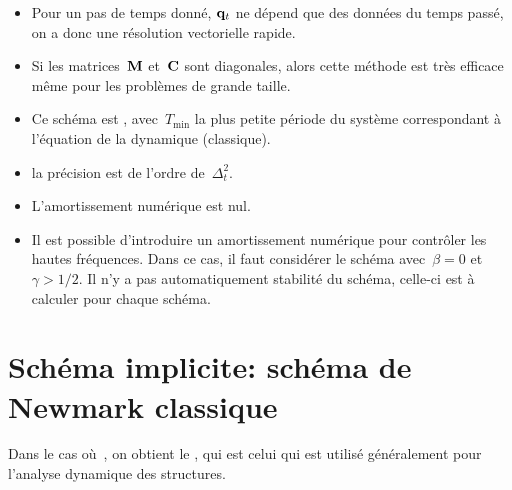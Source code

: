 \begin{itemize}
  \item Pour un pas de temps donné, $\VV{q}_t$ ne dépend que des données du temps passé,
	on a donc une résolution vectorielle rapide.
  \item Si les matrices~$\MM{M}$ et~$\MM{C}$ sont diagonales, alors cette méthode est 
   très efficace même pour les problèmes de grande taille.
  \item Ce schéma est , avec~$T_{\min}$ la plus petite période du système
   correspondant à l'équation de la dynamique (classique).
  \item la précision est de l'ordre de~$\Delta_t^2$.
  \item L'amortissement numérique est nul.
  \item Il est possible d'introduire un amortissement numérique pour contrôler les hautes
	fréquences. Dans ce cas, il faut considérer le schéma avec~$\beta=0$ et~$\gamma>1/2$.
	Il n'y a pas automatiquement stabilité du schéma, celle-ci est à calculer pour chaque
	schéma.
\end{itemize}

\medskip
\section{Schéma implicite: schéma de Newmark classique}

Dans le cas où~, on obtient le , qui est celui qui est utilisé généralement pour l'analyse dynamique des structures.

